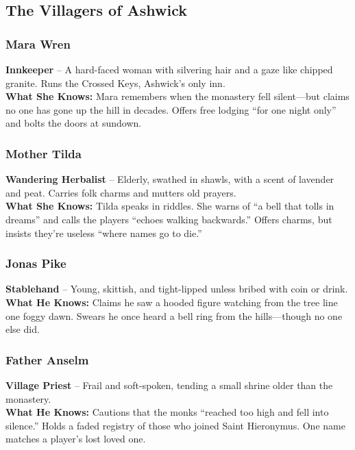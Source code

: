 \documentclass[nodeprecatedcode,bg=print]{dndbook}
\begin{document}
\subsection*{The Villagers of Ashwick}
\begin{paracol}{2}
    
    \subsubsection*{Mara Wren}
    \textbf{Innkeeper} – A hard-faced woman with silvering hair and a gaze like chipped granite. Runs the Crossed Keys, Ashwick’s only inn.\\
    \noindent\textbf{What She Knows:} Mara remembers when the monastery fell silent—but claims no one has gone up the hill in decades. Offers free lodging “for one night only” and bolts the doors at sundown.

    \vspace{0.5\baselineskip}
    \subsubsection*{Mother Tilda}
    \textbf{Wandering Herbalist} – Elderly, swathed in shawls, with a scent of lavender and peat. Carries folk charms and mutters old prayers.\\
    \noindent\textbf{What She Knows:} Tilda speaks in riddles. She warns of “a bell that tolls in dreams” and calls the players “echoes walking backwards.” Offers charms, but insists they’re useless “where names go to die.”

    \switchcolumn

    \vspace{0.5\baselineskip}
    \subsubsection*{Jonas Pike}
    \textbf{Stablehand} – Young, skittish, and tight-lipped unless bribed with coin or drink.\\
    \noindent\textbf{What He Knows:} Claims he saw a hooded figure watching from the tree line one foggy dawn. Swears he once heard a bell ring from the hills—though no one else did.

    \vspace{0.5\baselineskip}
    \subsubsection*{Father Anselm}
    \textbf{Village Priest} – Frail and soft-spoken, tending a small shrine older than the monastery.\\
    \noindent\textbf{What He Knows:} Cautions that the monks “reached too high and fell into silence.” Holds a faded registry of those who joined Saint Hieronymus. One name matches a player’s lost loved one.
\end{paracol}
\end{document}
